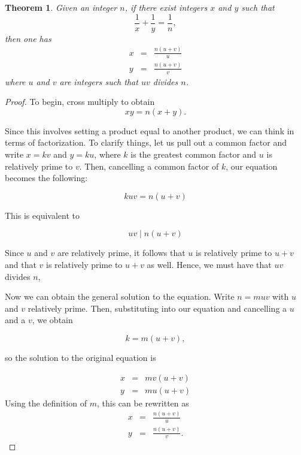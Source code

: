 \documentclass[12pt]{article}
\newtheorem{theorem}{Theorem}
\begin{document}
\begin{theorem}
Given an integer $n$, if there exist integers $x$ and $y$ such that
\[ 
\frac{1}{x} + \frac{1}{y} = \frac{1}{n} ,
\]
then one has
\begin{eqnarray*}
x &=& \frac{n(u+v)}{u} \\
y &=& \frac{n(u+v)}{v}
\end{eqnarray*}
where $u$ and $v$ are integers such that $uv$ divides $n$.
\end{theorem}

\begin{proof}
To begin, cross multiply to obtain
\[
xy = n(x+y).
\]

Since this involves setting a product equal to another
product, we can think in terms of factorization. To
clarify things, let us pull out a common factor and
write $x = kv$ and $y = ku$, where $k$ is the greatest
common factor and $u$ is relatively prime to $v$. Then,
cancelling a common factor of $k$, our equation becomes
the following:

\[
kuv = n(u+v)
\]

This is equivalent to

\[
uv \mid n(u+v)
\]

Since $u$ and $v$ are relatively prime, it follows that $u$ is
relatively prime to $u+v$ and that $v$ is relatively prime to
$u+v$ as well. Hence, we must have that $uv$ divides $n$,

Now we can obtain the general solution to the equation.
Write $n = muv$ with $u$ and $v$ relatively prime. Then,
substituting into our equation and cancelling a $u$ and a
$v$, we obtain

\[
k = m(u+v),
\]

so the solution to the original equation is

\begin{eqnarray*}
x &=& mv(u+v) \\
y &=& mu(u+v)
\end{eqnarray*}
Using the definition of $m$, this can be rewritten as
\begin{eqnarray*}
x &=& \frac{n(u+v)}{u} \\
y &=& \frac{n(u+v)}{v}.
\end{eqnarray*}
\end{proof}
\end{document}

